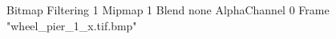 {Bitmap
	{Filtering 1}
	{Mipmap 1}
	{Blend none}
	{AlphaChannel 0}
	{Frame "wheel_pier_1_x.tif.bmp"}
}
